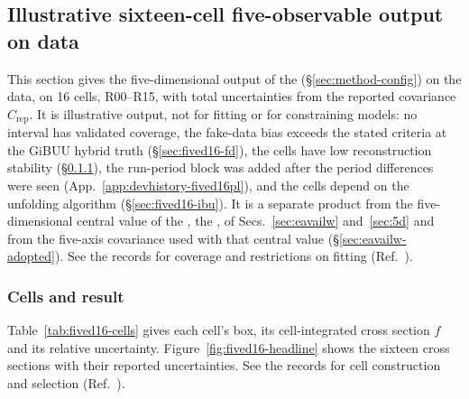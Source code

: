 \subsection{Illustrative sixteen-cell five-observable output on data}
\label{sec:fived16}

This section gives the five-dimensional output of the \estMultiD{} (\S\ref{sec:method-config}) on the data, on 16 cells, R00--R15, with total uncertainties from the reported covariance $C_{\mathrm{rep}}$. It is illustrative output, not for fitting or for constraining models: no interval has validated coverage, the fake-data bias exceeds the stated criteria at the GiBUU hybrid truth (\S\ref{sec:fived16-fd}), the cells  have low reconstruction stability (\S\ref{sec:fived16-result}), the run-period block was added after the period differences were seen (App.~\ref{app:devhistory-fived16pl}), and the cells depend on the unfolding algorithm (\S\ref{sec:fived16-ibu}). It is a separate product from the five-dimensional central value of the \estPurity{}, the \resFiveAxis{}, of Secs.~\ref{sec:eavailw} and~\ref{sec:5d} and from the five-axis covariance used with that central value (\S\ref{sec:eavailw-adopted}). See the records for coverage and restrictions on fitting (Ref.~\cite{NoteRecords2026}).

\subsubsection{Cells and result}
\label{sec:fived16-result}
Table~\ref{tab:fived16-cells} gives each cell's box, its cell-integrated cross section $f$ and its relative uncertainty. Figure~\ref{fig:fived16-headline} shows the sixteen cross sections with their reported uncertainties. See the records for cell construction and selection (Ref.~\cite{NoteRecords2026}).

